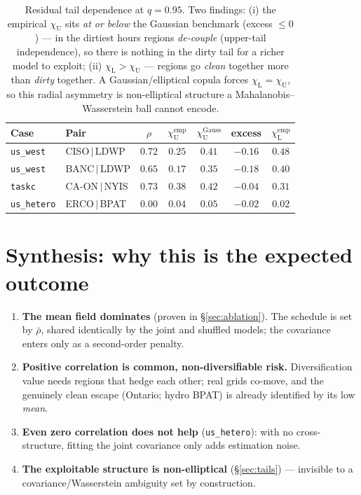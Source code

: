 \documentclass[11pt]{article}
\newcommand{\chiU}{\chi_{\mathrm{U}}}
\newcommand{\chiL}{\chi_{\mathrm{L}}}
\begin{document}
\begin{table}[h]\centering\small
\begin{tabular}{@{}llccccc@{}}
\toprule
\textbf{Case} & \textbf{Pair} & $\rho$ & $\chiU^{\mathrm{emp}}$ & $\chiU^{\mathrm{Gauss}}$ & \textbf{excess} & $\chiL^{\mathrm{emp}}$ \\
\midrule
\texttt{us\_west}   & CISO\,$|$\,LDWP & $0.72$ & $0.25$ & $0.41$ & $-0.16$ & $0.48$ \\
\texttt{us\_west}   & BANC\,$|$\,LDWP & $0.65$ & $0.17$ & $0.35$ & $-0.18$ & $0.40$ \\
\texttt{taskc}      & CA-ON\,$|$\,NYIS & $0.73$ & $0.38$ & $0.42$ & $-0.04$ & $0.31$ \\
\texttt{us\_hetero} & ERCO\,$|$\,BPAT  & $0.00$ & $0.04$ & $0.05$ & $-0.02$ & $0.02$ \\
\bottomrule
\end{tabular}
\caption{Residual tail dependence at $q=0.95$. Two findings: (i) the empirical
$\chiU$ sits \emph{at or below} the Gaussian benchmark (excess $\le 0$) --- in the
dirtiest hours regions \emph{de-couple} (upper-tail independence), so there is nothing
in the dirty tail for a richer model to exploit; (ii) $\chiL > \chiU$ --- regions go
\emph{clean} together more than \emph{dirty} together. A Gaussian/elliptical copula
forces $\chiL=\chiU$, so this radial asymmetry is non-elliptical structure a
Mahalanobis--Wasserstein ball cannot encode.}
\label{tab:tails}
\end{table}

\section{Synthesis: why this is the expected outcome}\label{sec:why}

\begin{enumerate}[leftmargin=1.4em,itemsep=2pt]
  \item \textbf{The mean field dominates} (proven in \S\ref{sec:ablation}). The schedule
  is set by $\bar\rho$, shared identically by the joint and shuffled models; the
  covariance enters only as a second-order penalty.
  \item \textbf{Positive correlation is common, non-diversifiable risk.} Diversification
  value needs regions that hedge each other; real grids co-move, and the genuinely clean
  escape (Ontario; hydro BPAT) is already identified by its low \emph{mean}.
  \item \textbf{Even zero correlation does not help} (\texttt{us\_hetero}): with no
  cross-structure, fitting the joint covariance only adds estimation noise.
  \item \textbf{The exploitable structure is non-elliptical} (\S\ref{sec:tails}) ---
  invisible to a covariance/Wasserstein ambiguity set by construction.
\end{enumerate}
\end{document}
